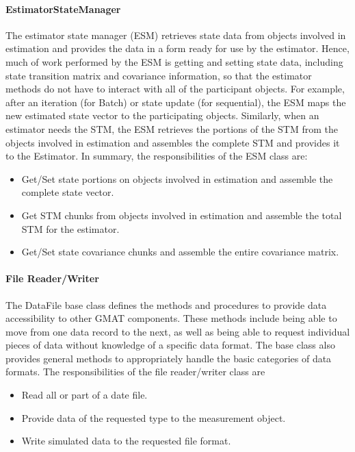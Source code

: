 \paragraph{EstimatorStateManager}  The estimator state manager (ESM) retrieves state data from
objects involved in estimation and provides the data in a form ready for use by the estimator.
Hence, much of work performed by the ESM is getting and setting state data, including state
transition matrix and covariance information, so that the estimator methods do not have to interact
with all of the participant objects.  For example, after an iteration (for Batch) or state update
(for sequential), the ESM maps the new estimated state vector to the participating objects.
Similarly, when an estimator needs the STM, the ESM retrieves the portions of the STM from the
objects involved in estimation and assembles the complete STM and provides it to the Estimator.  In
summary, the responsibilities of the ESM class are:
\begin{itemize}
\item Get/Set state portions on objects involved in estimation and assemble the complete state
vector.
\item Get STM chunks from objects involved in estimation and assemble the total STM for the
estimator.
\item Get/Set state covariance chunks and assemble the entire covariance matrix.
\end{itemize}

\paragraph{File Reader/Writer}  The DataFile base class defines the methods and procedures to
provide data accessibility to other GMAT components. These methods include being able to move from
one data record to the next, as well as being able to request individual pieces of data without
knowledge of a specific data format.  The base class also provides general methods to appropriately
handle the basic categories of data formats.  The responsibilities of the file reader/writer class
are
\begin{itemize}
\item Read all or part of a date file.
\item Provide data of the requested type to the measurement object.
\item Write simulated data to the requested file format.
\end{itemize}

